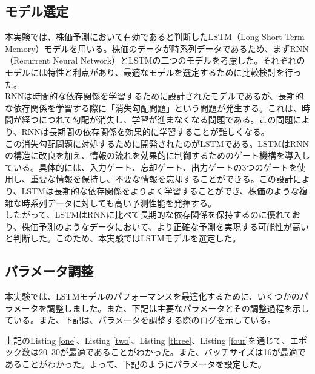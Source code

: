 \documentclass[a4paper, 11pt, titlepage]{jsarticle}
\begin{document}
\subsection{モデル選定}
\indent 本実験では、株価予測において有効であると判断したLSTM（Long Short-Term Memory）モデルを用いる。株価のデータが時系列データであるため、まずRNN（Recurrent Neural Network）とLSTMの二つのモデルを考慮した。それぞれのモデルには特性と利点があり、最適なモデルを選定するために比較検討を行った。\\
\indent RNNは時間的な依存関係を学習するために設計されたモデルであるが、長期的な依存関係を学習する際に「消失勾配問題」という問題が発生する。これは、時間が経つにつれて勾配が消失し、学習が進まなくなる問題である。この問題により、RNNは長期間の依存関係を効果的に学習することが難しくなる。\\
\indent この消失勾配問題に対処するために開発されたのがLSTMである。LSTMはRNNの構造に改良を加え、情報の流れを効果的に制御するためのゲート機構を導入している。具体的には、入力ゲート、忘却ゲート、出力ゲートの3つのゲートを使用し、重要な情報を保持し、不要な情報を忘却することができる。この設計により、LSTMは長期的な依存関係をよりよく学習することができ、株価のような複雑な時系列データに対しても高い予測性能を発揮する。\\
\indent したがって、LSTMはRNNに比べて長期的な依存関係を保持するのに優れており、株価予測のようなデータにおいて、より正確な予測を実現する可能性が高いと判断した。このため、本実験ではLSTMモデルを選定した。

\subsection{パラメータ調整}
\indent 本実験では、LSTMモデルのパフォーマンスを最適化するために、いくつかのパラメータを調整しました。また、下記は主要なパラメータとその調整過程を示している。また、下記は、パラメータを調整する際のログを示している。





\indent 上記のListing \ref{one}、Listing \ref{two}、Listing \ref{three}、Listing \ref{four}を通じて、エポック数は20~30が最適であることがわかった。また、バッチサイズは16が最適であることがわかった。よって、下記のようにパラメータを設定した。
\end{document}
